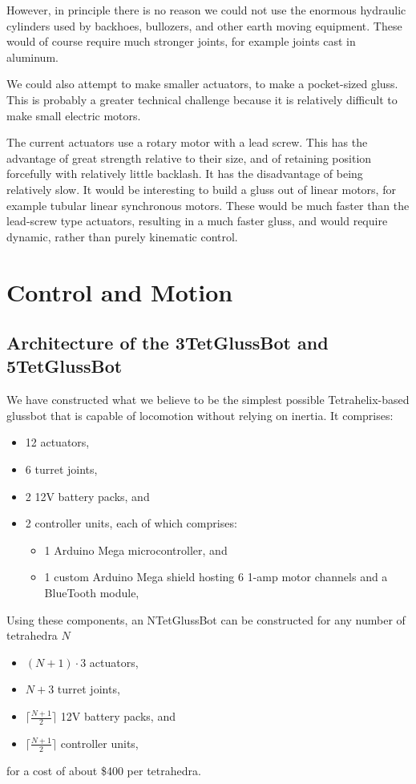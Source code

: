 \documentclass[11pt]{article}
\begin{document}
However, in principle there is no reason we could not use the enormous hydraulic cylinders
used by backhoes, bullozers, and other earth moving equipment. These would of course require much
stronger joints, for example joints cast in aluminum.

We could also attempt to make smaller actuators, to make a pocket-sized gluss. This is probably
a greater technical challenge because it is relatively difficult to make small electric motors.

The current actuators use a rotary motor with a lead screw. This has the advantage of great
strength relative to their size, and of retaining position forcefully with relatively little backlash. It has the disadvantage
of being relatively slow. It would be interesting to build a gluss out of linear motors, for
example tubular linear synchronous motors. These would be much faster than the lead-screw type
actuators, resulting in a much faster gluss, and would require dynamic, rather than purely kinematic control. 

\section{Control and Motion}
\subsection{Architecture of the 3TetGlussBot and 5TetGlussBot}

We have constructed what we believe to be the simplest possible Tetrahelix-based glussbot that is capable of locomotion
without relying on inertia.
It comprises:
\begin{itemize}  
\item 12 actuators,
\item 6 turret joints,
\item 2 12V battery packs, and
\item 2 controller units, each of which comprises:
\begin{itemize}  
\item 1 Arduino Mega microcontroller, and
\item 1 custom Arduino Mega shield hosting 6 1-amp motor channels and a BlueTooth module,
\end{itemize}  
\end{itemize}

Using these components, an NTetGlussBot can be constructed for any number of tetrahedra $N$

\begin{itemize}  
\item $(N + 1)\cdot 3$  actuators,
\item $N+3$ turret joints,
\item $\lceil \frac{N + 1}{2} \rceil$ 12V battery packs, and
\item $\lceil \frac{N + 1}{2} \rceil$ controller units,
\end{itemize}
for a cost of about \$400 per tetrahedra.
\end{document}
